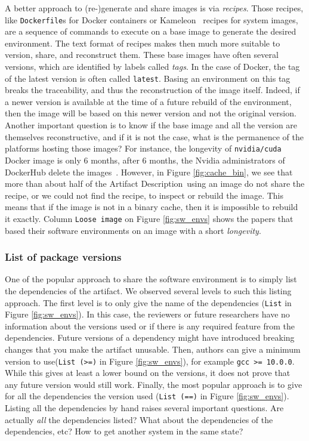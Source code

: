 \documentclass[sigconf,natbib=false]{acmart}
\newcommand{\ad}{Artifact Description}
\begin{document}
A better approach to (re-)generate and share images is via \emph{recipes}.
Those recipes, like \texttt{Dockerfile}s for Docker containers or Kameleon\ \cite{ruiz_reconstructable_2015} recipes for system images, are a sequence of commands to execute on a base image to generate the desired environment.
The text format of recipes makes then much more suitable to version, share, and reconstruct them.
These base images have often several versions, which are identified by labels called \emph{tags}.
In the case of Docker, the tag of the latest version is often called \texttt{latest}.
Basing an environment on this tag breaks the traceability, and thus the reconstruction of the image itself.
Indeed, if a newer version is available at the time of a future rebuild of the environment, then the image will be based on this newer version and not the original version.
Another important question is to know if the base image and all the version are themselves reconstructive, and if it is not the case, what is the permanence of the platforms hosting those images?
For instance, the longevity of \texttt{nvidia/cuda} Docker image is only 6 months, after 6 months, the Nvidia administrators of DockerHub delete the images\ \cite{nvidia_cuda_lifetime}.
However, in Figure \ref{fig:cache_bin}, we see that more than about half of the \ad\ using an image do not share the recipe, or we could not find the recipe, to inspect or rebuild the image.
This means that if the image is not in a binary cache, then it is impossible to rebuild it exactly.
Column \texttt{Loose image} on Figure \ref{fig:sw_envs} shows the papers that based their software environments on an image with a short \emph{longevity}.


\subsubsection{List of package versions}\label{sec:sop:sw:list}

One of the popular approach to share the software environment is to simply list the dependencies of the artifact.
We observed several levels to such this listing approach.
The first level is to only give the name of the dependencies (\texttt{List} in Figure \ref{fig:sw_envs}).
In this case, the reviewers or future researchers have no information about the versions used or if there is any required feature from the dependencies.
Future versions of a dependency might have introduced breaking changes that you make the artifact unusable.
Then, authors can give a minimum version to use(\texttt{List (>=)} in Figure \ref{fig:sw_envs}), for example \texttt{gcc >= 10.0.0}.
While this gives at least a lower bound on the versions, it does not prove that any future version would still work.
Finally, the most popular approach is to give for all the dependencies the version used (\texttt{List (==)} in Figure \ref{fig:sw_envs}).
Listing all the dependencies by hand raises several important questions.
Are actually \emph{all} the dependencies listed?
What about the dependencies of the dependencies, etc?
How to get another system in the same state?
\end{document}

